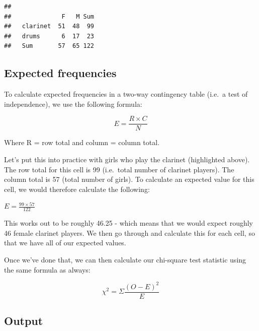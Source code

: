 \documentclass[
]{book}
\newenvironment{Shaded}{\begin{snugshade}}{\end{snugshade}}
\newcommand{\FunctionTok}[1]{\textcolor[rgb]{0.13,0.29,0.53}{\textbf{#1}}}
\newcommand{\NormalTok}[1]{#1}
\newcommand{\OtherTok}[1]{\textcolor[rgb]{0.56,0.35,0.01}{#1}}
\newcommand{\SpecialCharTok}[1]{\textcolor[rgb]{0.81,0.36,0.00}{\textbf{#1}}}
\begin{document}
\begin{Shaded}
\end{Shaded}

\begin{verbatim}
##           
##              F   M Sum
##   clarinet  51  48  99
##   drums      6  17  23
##   Sum       57  65 122
\end{verbatim}

\subsection{Expected frequencies}\label{expected-frequencies}

To calculate expected frequencies in a two-way contingency table (i.e.~a test of independence), we use the following formula:

\[
E = \frac{R \times C}{N}
\]

Where R = row total and column = column total.

Let's put this into practice with girls who play the clarinet (highlighted above). The row total for this cell is 99 (i.e.~total number of clarinet players). The column total is 57 (total number of girls). To calculate an expected value for this cell, we would therefore calculate the following:

\(E = \frac{99 \times 57}{122}\)

This works out to be roughly 46.25 - which means that we would expect roughly 46 female clarinet players. We then go through and calculate this for each cell, so that we have all of our expected values.

Once we've done that, we can then calculate our chi-square test statistic using the same formula as always:

\[
\chi^2 = \Sigma \frac{(O-E)^2}{E}
\]

\subsection{Output}\label{output-1}
\end{document}
